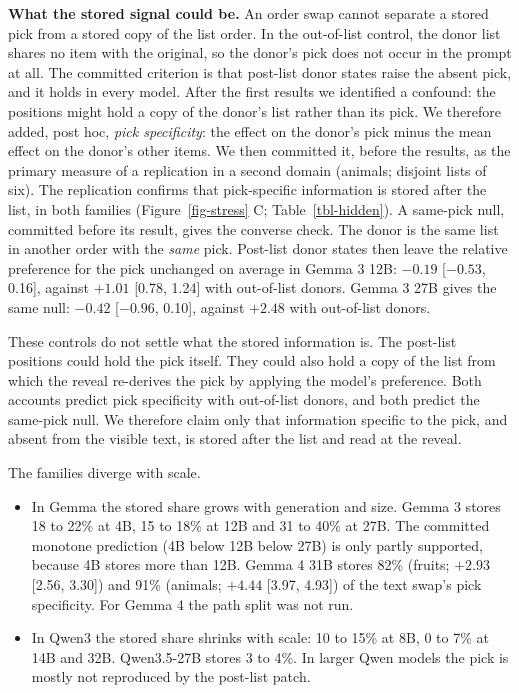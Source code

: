 \documentclass[
]{article}
\providecommand{\tightlist}{%
  \setlength{\itemsep}{0pt}\setlength{\parskip}{0pt}}
\begin{document}
\textbf{What the stored signal could be.} An order swap cannot separate
a stored pick from a stored copy of the list order. In the out-of-list
control, the donor list shares no item with the original, so the donor's
pick does not occur in the prompt at all. The committed criterion is
that post-list donor states raise the absent pick, and it holds in every
model. After the first results we identified a confound: the positions
might hold a copy of the donor's list rather than its pick. We therefore
added, post hoc, \emph{pick specificity}: the effect on the donor's pick
minus the mean effect on the donor's other items. We then committed it,
before the results, as the primary measure of a replication in a second
domain (animals; disjoint lists of six). The replication confirms that
pick-specific information is stored after the list, in both families
(Figure~\ref{fig-stress} C; Table~\ref{tbl-hidden}). A same-pick null,
committed before its result, gives the converse check. The donor is the
same list in another order with the \emph{same} pick. Post-list donor
states then leave the relative preference for the pick unchanged on
average in Gemma 3 12B: \(-0.19\) {[}\(-0.53\), 0.16{]}, against
\(+1.01\) {[}0.78, 1.24{]} with out-of-list donors. Gemma 3 27B gives
the same null: \(-0.42\) {[}\(-0.96\), 0.10{]}, against \(+2.48\) with
out-of-list donors.

These controls do not settle what the stored information is. The
post-list positions could hold the pick itself. They could also hold a
copy of the list from which the reveal re-derives the pick by applying
the model's preference. Both accounts predict pick specificity with
out-of-list donors, and both predict the same-pick null. We therefore
claim only that information specific to the pick, and absent from the
visible text, is stored after the list and read at the reveal.

The families diverge with scale.

\begin{itemize}
\tightlist
\item
  In Gemma the stored share grows with generation and size. Gemma 3
  stores 18 to 22\% at 4B, 15 to 18\% at 12B and 31 to 40\% at 27B. The
  committed monotone prediction (4B below 12B below 27B) is only partly
  supported, because 4B stores more than 12B. Gemma 4 31B stores 82\%
  (fruits; \(+2.93\) {[}2.56, 3.30{]}) and 91\% (animals; \(+4.44\)
  {[}3.97, 4.93{]}) of the text swap's pick specificity. For Gemma 4 the
  path split was not run.
\item
  In Qwen3 the stored share shrinks with scale: 10 to 15\% at 8B, 0 to
  7\% at 14B and 32B. Qwen3.5-27B stores 3 to 4\%. In larger Qwen models
  the pick is mostly not reproduced by the post-list patch.
\end{itemize}
\end{document}
